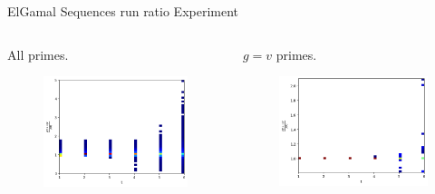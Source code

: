 \begin{frame}{ElGamal Sequences run ratio Experiment}
    \begin{columns}
        \begin{column}{0.45\textwidth}
        \begin{center}
            All primes.
        \end{center}
            \begin{figure}
                \centering
                \includegraphics[width=\textwidth]{figures/AllDataNormalizedrunratio.png}
            \end{figure}
        \end{column}
        \begin{column}{0.45\textwidth}
        \begin{center}
            $g = v$ primes.
        \end{center}
            \begin{figure}
                \centering
                \includegraphics[width=\textwidth]{figures/AllDataAndvisGenNormalizedrunratio.png}

\end{figure}
\end{column}
\end{columns}
\end{frame}
